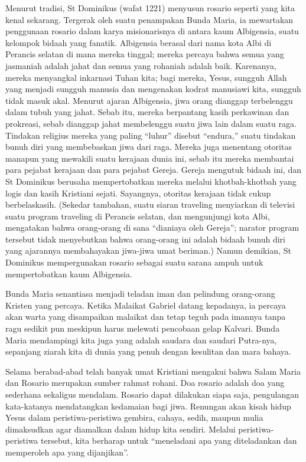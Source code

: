 Menurut tradisi, St Dominikus (wafat 1221) menyusun rosario seperti yang kita kenal sekarang. Tergerak oleh suatu penampakan Bunda Maria, ia mewartakan penggunaan rosario dalam karya misionarisnya di antara kaum Albigensia, suatu kelompok bidaah yang fanatik. Albigensia berasal dari nama kota Albi di Perancis selatan di mana mereka tinggal; mereka percaya bahwa semua yang jasmaniah adalah jahat dan semua yang rohaniah adalah baik. Karenanya, mereka menyangkal inkarnasi Tuhan kita; bagi mereka, Yesus, sungguh Allah yang menjadi sungguh manusia dan mengenakan kodrat manusiawi kita, sungguh tidak masuk akal. Menurut ajaran Albigensia, jiwa orang dianggap terbelenggu dalam tubuh yang jahat. Sebab itu, mereka berpantang kasih perkawinan dan prokreasi, sebab dianggap jahat membelenggu suatu jiwa lain dalam suatu raga. Tindakan religius mereka yang paling ``luhur'' disebut ``endura,'' suatu tindakan bunuh diri yang membebaskan jiwa dari raga. Mereka juga menentang otoritas manapun yang mewakili suatu kerajaan dunia ini, sebab itu mereka membantai para pejabat kerajaan dan para pejabat Gereja. Gereja mengutuk bidaah ini, dan St Dominikus berusaha mempertobatkan mereka melalui khotbah-khotbah yang logis dan kasih Kristiani sejati. Sayangnya, otoritas kerajaan tidak cukup berbelaskasih. (Sekedar tambahan, suatu siaran traveling menyiarkan di televisi suatu program traveling di Perancis selatan, dan mengunjungi kota Albi, mengatakan bahwa orang-orang di sana ``dianiaya oleh Gereja''; narator program tersebut tidak menyebutkan bahwa orang-orang ini adalah bidaah bunuh diri yang ajarannya membahayakan jiwa-jiwa umat beriman.) Namun demikian, St Dominikus mempergunakan rosario sebagai suatu sarana ampuh untuk mempertobatkan kaum Albigensia.

Bunda Maria senantiasa menjadi teladan iman dan pelindung orang-orang Kristen yang percaya. Ketika Malaikat Gabriel datang kepadanya, ia percaya akan warta yang disampaikan malaikat dan tetap teguh pada imannya tanpa ragu sedikit pun meskipun harus melewati pencobaan gelap Kalvari. Bunda Maria mendampingi kita juga yang adalah saudara dan saudari Putra-nya, sepanjang ziarah kita di dunia yang penuh dengan kesulitan dan mara bahaya.

Selama berabad-abad telah banyak umat Kristiani mengakui bahwa Salam Maria dan Rosario merupakan sumber rahmat rohani. Doa rosario adalah doa yang sederhana sekaligus mendalam. Rosario dapat dilakukan siapa saja, pengulangan kata-katanya mendatangkan kedamaian bagi jiwa. Renungan akan kisah hidup Yesus dalam peristiwa-peristiwa gembira, cahaya, sedih, maupun mulia dimaksudkan agar diamalkan dalam hidup kita sendiri. Melalui peristiwa-peristiwa tersebut, kita berharap untuk ``meneladani apa yang diteladankan dan memperoleh apa yang dijanjikan''.

